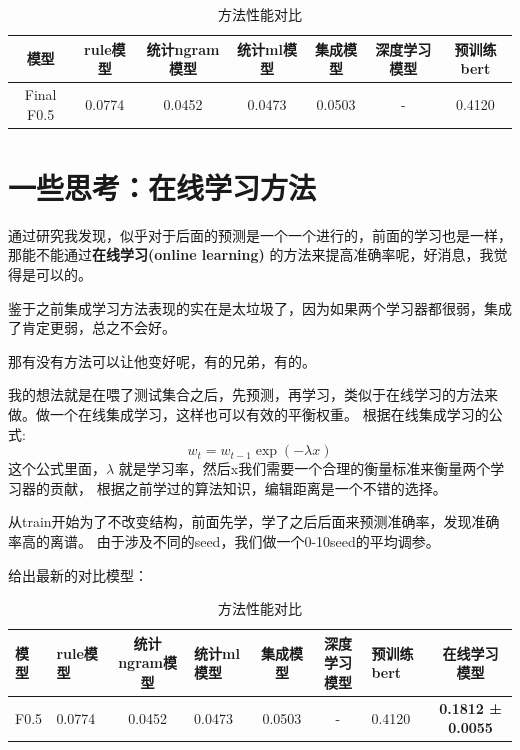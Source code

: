 \documentclass[answers]{exam}  %
\begin{document}
\begin{table}[H]
    \centering
    \begin{tabular}{ccccccc}
    \toprule
    \textbf{模型} & \textbf{rule模型} & \textbf{统计ngram模型} & \textbf{统计ml模型} & \textbf{集成模型} & \textbf{深度学习模型} & \textbf{预训练bert}\\
    \midrule
    Final F0.5 & 0.0774 & 0.0452 & 0.0473 & 0.0503 & - & 0.4120\\
    \bottomrule
    \end{tabular}
    \caption{方法性能对比}
    \end{table}

\section{一些思考：在线学习方法}

通过研究我发现，似乎对于后面的预测是一个一个进行的，前面的学习也是一样，那能不能通过\textbf{在线学习(online learning)}
的方法来提高准确率呢，好消息，我觉得是可以的。

鉴于之前集成学习方法表现的实在是太垃圾了，因为如果两个学习器都很弱，集成了肯定更弱，总之不会好。

那有没有方法可以让他变好呢，有的兄弟，有的。

我的想法就是在喂了测试集合之后，先预测，再学习，类似于在线学习的方法来做。做一个在线集成学习，这样也可以有效的平衡权重。
根据在线集成学习的公式:
\[ w_t = w_{t-1} \exp(-\lambda x) \]
这个公式里面，$\lambda$ 就是学习率，然后x我们需要一个合理的衡量标准来衡量两个学习器的贡献，
根据之前学过的算法知识，编辑距离是一个不错的选择。

从train开始为了不改变结构，前面先学，学了之后后面来预测准确率，发现准确率高的离谱。
由于涉及不同的seed，我们做一个0-10seed的平均调参。

给出最新的对比模型：

\begin{table}[h]
    \centering
    \begin{tabular}{p{0.5cm}p{0.8cm}cp{1.3cm}ccp{1.2cm}c}
    \toprule
    \textbf{模型} & \textbf{rule模型} & \textbf{统计ngram模型} & \textbf{统计ml模型} & \textbf{集成模型} & \textbf{深度学习模型} & \textbf{预训练bert} &\textbf{在线学习模型}\\
    \midrule
    F0.5 & 0.0774 & 0.0452 & 0.0473 & 0.0503 & - & 0.4120 & \textbf{0.1812 ± 0.0055} \\
    \bottomrule
    \end{tabular}
    \caption{方法性能对比}
    \end{table}
\end{document}
